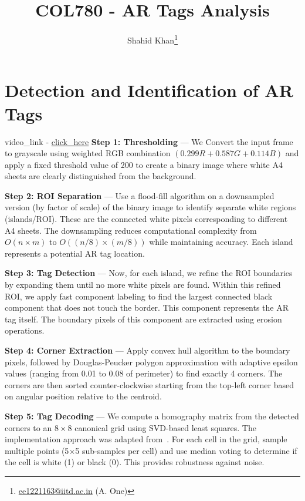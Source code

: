 \documentclass[9pt,a4paper,twocolumn,twoside]{tau-class/tau}
\title{COL780 - AR Tags Analysis}
\author[a,1]{Shahid Khan\thanks{\href{mailto:ee1221163@iitd.ac.in}{ee1221163@iitd.ac.in} (A. One)}}
\begin{document}
		
    \maketitle 
    \thispagestyle{firststyle}
    

\section{Detection and Identification of AR Tags} 
    video\_link - \href{https://drive.google.com/drive/folders/1yq0wepZofnC9S_1A7GuBsgRKsac3On8C?usp=drive_link}{click\_here}
    \newline
    \textbf{Step 1: Thresholding} — We Convert the input frame to grayscale using weighted RGB combination $(0.299R + 0.587G + 0.114B)$ and apply a fixed threshold value of 200 to create a binary image where white A4 sheets are clearly distinguished from the background.
    
    \textbf{Step 2: ROI Separation} — Use a flood-fill algorithm on a downsampled version (by factor of scale) of the binary image to identify separate white regions (islands/ROI). These are the connected white pixels corresponding to different A4 sheets. The downsampling reduces computational complexity from $O(n \times m)$ to $O((n/8) \times (m/8))$ while maintaining accuracy. Each island represents a potential AR tag location.
    
    \textbf{Step 3: Tag Detection} — Now, for each island, we refine the ROI boundaries by expanding them until no more white pixels are found. Within this refined ROI, we apply fast component labeling to find the largest connected black component that does not touch the border. This component represents the AR tag itself. The boundary pixels of this component are extracted using erosion operations.
    
    \textbf{Step 4: Corner Extraction} — Apply convex hull algorithm to the boundary pixels, followed by Douglas-Peucker polygon approximation with adaptive epsilon values (ranging from 0.01 to 0.08 of perimeter) to find exactly 4 corners. The corners are then sorted counter-clockwise starting from the top-left corner based on angular position relative to the centroid.
    
    \textbf{Step 5: Tag Decoding} — We compute a homography matrix from the detected corners to an $8 \times 8$ canonical grid using SVD-based least squares. The implementation approach was adapted from~\cite{rastogi_artag}. For each cell in the grid, sample multiple points (5$\times$5 sub-samples per cell) and use median voting to determine if the cell is white (1) or black (0). This provides robustness against noise.
    
\end{document}
